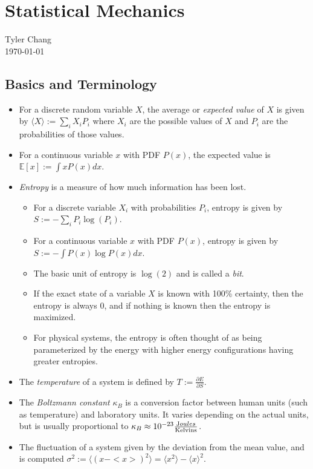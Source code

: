 \documentclass[12pt]{article}
\begin{document}
\section*{Statistical Mechanics}
Tyler Chang\\
\today

\subsection*{Basics and Terminology}

\begin{itemize}
\item For a discrete random variable $X$, the average or {\it expected value}
of $X$ is given by $\langle X \rangle := \sum_i X_i P_i$ where $X_i$ are the 
possible values of $X$ and $P_i$ are the probabilities of those values.
\item For a continuous variable $x$ with PDF $P(x)$, the expected value is
$\mathbb{E}[x] := \int x P(x) dx$.
\item {\it Entropy} is a measure of how much information has been lost.
\begin{itemize}
\item For a discrete variable $X_i$ with probabilities $P_i$, entropy is given
by $S := -\sum_i P_i \log(P_i)$.
\item For a continuous variable $x$ with PDF $P(x)$, entropy is given by
$S := -\int P(x) \log P(x) dx$.
\item The basic unit of entropy is $\log(2)$ and is called a {\it bit}.
\item If the exact state of a variable $X$ is known with 100\% certainty,
then the entropy is always $0$, and if nothing is known then the entropy
is maximized.
\item For physical systems, the entropy is often thought of as being
parameterized by the energy with higher energy configurations having greater
entropies.
\end{itemize}
\item The {\it temperature} of a system is defined by 
$T := \frac{\partial E}{\partial S}$.
\item The {\it Boltzmann constant} $\kappa_B$ is a conversion factor between
human units (such as temperature) and laboratory units.
It varies depending on the actual units, but is usually proportional to
$\kappa_B \approx 10^{-23} \frac{{\text Joules}}{\text{Kelvins}}$.
\item The fluctuation of a system given by the deviation from the mean value,
and is computed 
$\sigma^2:=\langle\left(x-<x>\right)^2\rangle=\langle x^2\rangle-\langle x\rangle^2.$
\end{itemize}
\end{document}
